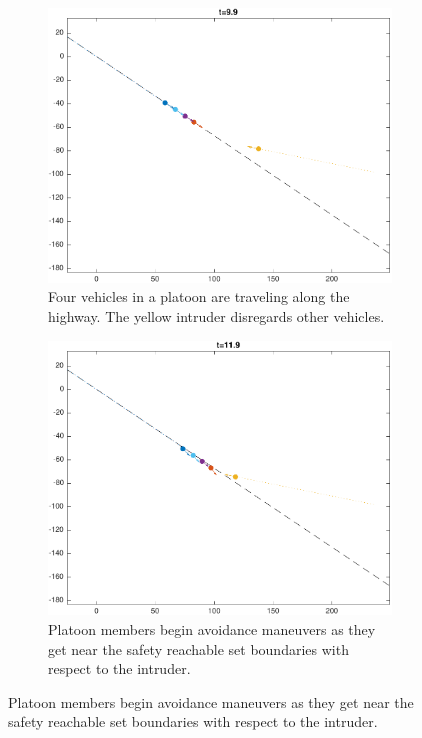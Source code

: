\begin{figure}
    \centering
    \begin{subfigure}[t]{0.23\textwidth} \label{subfig:in_100}
        \includegraphics[width=\textwidth]{fig/in_100}
        \caption{Four vehicles in a platoon are traveling along the highway. The yellow intruder disregards other vehicles.}
    \end{subfigure}
    \begin{subfigure}[t]{0.23\textwidth} \label{subfig:in_120}
        \includegraphics[width=\textwidth]{fig/in_120}
        \caption{Platoon members begin avoidance maneuvers as they get near the safety reachable set boundaries with respect to the intruder.}
    \end{subfigure}


\end{figure}
